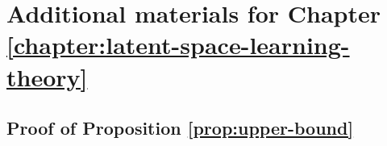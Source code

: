 
\ifpdf
    \graphicspath{{Appendix3/Figs/Raster/}{Appendix3/Figs/PDF/}{Appendix3/Figs/}}
\else
    \graphicspath{{Appendix3/Figs/Vector/}{Appendix3/Figs/}}
\fi


\chapter{Additional materials for Chapter \ref{chapter:latent-space-learning-theory}}\label{chapter:appendix-latex-space-learning-theory}

\section{Proof of Proposition \ref{prop:upper-bound}}\label{proof:prop1}

